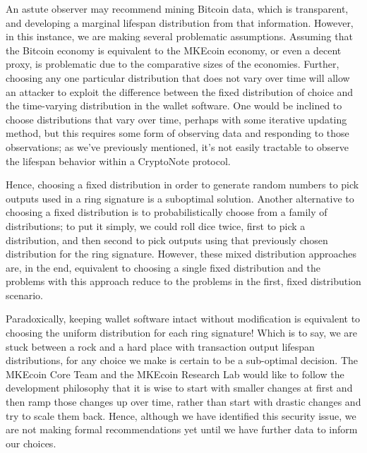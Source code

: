 \documentclass[12pt,english]{mrl}
\theoremstyle{definition}
\numberwithin{equation}{section}
\numberwithin{figure}{section}
\numberwithin{equation}{section}
\numberwithin{equation}{section}
\numberwithin{figure}{section}
\begin{document}
An astute observer may recommend mining Bitcoin data, which is transparent, and developing a marginal lifespan distribution from that information. However, in this instance, we are making several problematic assumptions. Assuming that the Bitcoin economy is equivalent to the MKEcoin economy, or even a decent proxy, is problematic due to the comparative sizes of the economies. Further, choosing any one particular distribution that does not vary over time will allow an attacker to exploit the difference between the fixed distribution of choice and the time-varying distribution in the wallet software. One would be inclined to choose distributions that vary over time, perhaps with some iterative updating method, but this requires some form of observing data and responding to those observations; as we've previously mentioned, it's not easily tractable to observe the lifespan behavior within a CryptoNote protocol.

Hence, choosing a fixed distribution in order to generate random numbers to pick outputs used in a ring signature is a suboptimal solution. Another alternative to choosing a fixed distribution is to probabilistically choose from a family of distributions; to put it simply, we could roll dice twice, first to pick a distribution, and then second to pick outputs using that previously chosen distribution for the ring signature. However, these mixed distribution approaches are, in the end, equivalent to choosing a single fixed distribution and the problems with this approach reduce to the problems in the first, fixed distribution scenario.

Paradoxically, keeping wallet software intact without modification is equivalent to choosing the uniform distribution for each ring signature! Which is to say, we are stuck between a rock and a hard place with transaction output lifespan distributions, for any choice we make is certain to be a sub-optimal decision. The MKEcoin Core Team and the MKEcoin Research Lab would like to follow the development philosophy that it is wise to start with smaller changes at first and then ramp those changes up over time, rather than start with drastic changes and try to scale them back. Hence, although we have identified this security issue, we are not making formal recommendations yet until we have further data to inform our choices.
\end{document}
